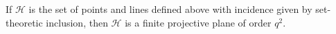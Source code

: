 If $\mathcal{H}$ is the set of points and lines defined above with incidence given by set-theoretic inclusion, then $\mathcal{H}$ is a finite projective plane of order $q^2$.
